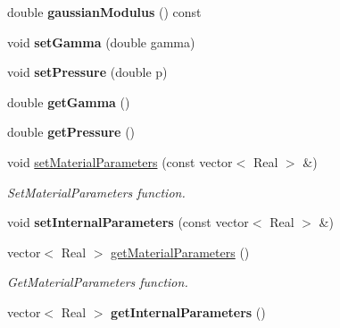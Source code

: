 \begin{DoxyCompactItemize}
\item 
\hypertarget{classvoom_1_1_gauge_lipid_aa9a75b3011b7d540182e32cba74de904}{
double {\bfseries gaussianModulus} () const }
\label{classvoom_1_1_gauge_lipid_aa9a75b3011b7d540182e32cba74de904}

\item 
\hypertarget{classvoom_1_1_gauge_lipid_af5e4b6a72eef48723634874529add78b}{
void {\bfseries setGamma} (double gamma)}
\label{classvoom_1_1_gauge_lipid_af5e4b6a72eef48723634874529add78b}

\item 
\hypertarget{classvoom_1_1_gauge_lipid_afb59e9c1fd5f7ad7e974c57be8aae4b8}{
void {\bfseries setPressure} (double p)}
\label{classvoom_1_1_gauge_lipid_afb59e9c1fd5f7ad7e974c57be8aae4b8}

\item 
\hypertarget{classvoom_1_1_gauge_lipid_abe4f73a484b6fbd2c644c5dbeceb842d}{
double {\bfseries getGamma} ()}
\label{classvoom_1_1_gauge_lipid_abe4f73a484b6fbd2c644c5dbeceb842d}

\item 
\hypertarget{classvoom_1_1_gauge_lipid_af70a4bd652c9fab0bcf6a745b9828ae7}{
double {\bfseries getPressure} ()}
\label{classvoom_1_1_gauge_lipid_af70a4bd652c9fab0bcf6a745b9828ae7}

\item 
\hypertarget{classvoom_1_1_gauge_lipid_a30875bf64ce028af177cb801280c79b6}{
void \hyperlink{classvoom_1_1_gauge_lipid_a30875bf64ce028af177cb801280c79b6}{setMaterialParameters} (const vector$<$ Real $>$ \&)}
\label{classvoom_1_1_gauge_lipid_a30875bf64ce028af177cb801280c79b6}

\begin{DoxyCompactList}\small\item\em SetMaterialParameters function. \item\end{DoxyCompactList}\item 
\hypertarget{classvoom_1_1_gauge_lipid_af371e039144f1bcff8ae6f2d26a3c9bb}{
void {\bfseries setInternalParameters} (const vector$<$ Real $>$ \&)}
\label{classvoom_1_1_gauge_lipid_af371e039144f1bcff8ae6f2d26a3c9bb}

\item 
\hypertarget{classvoom_1_1_gauge_lipid_aaf1003c766b2d3baf13a2052ca2e9d79}{
vector$<$ Real $>$ \hyperlink{classvoom_1_1_gauge_lipid_aaf1003c766b2d3baf13a2052ca2e9d79}{getMaterialParameters} ()}
\label{classvoom_1_1_gauge_lipid_aaf1003c766b2d3baf13a2052ca2e9d79}

\begin{DoxyCompactList}\small\item\em GetMaterialParameters function. \item\end{DoxyCompactList}\item 
\hypertarget{classvoom_1_1_gauge_lipid_af35d5f8460a5358c554ce89b69124a99}{
vector$<$ Real $>$ {\bfseries getInternalParameters} ()}
\label{classvoom_1_1_gauge_lipid_af35d5f8460a5358c554ce89b69124a99}

\end{DoxyCompactItemize}
